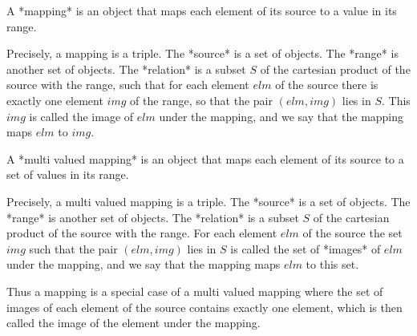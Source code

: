 
A *mapping* is an object that maps each element of its source to a value
in its range.

Precisely, a mapping is a triple.  The *source* is a set of objects.  The
*range* is another set of objects.  The *relation* is a subset $S$ of the
cartesian product  of  the  source  with  the range, such  that for  each
element $elm$ of  the source there is exactly  one element  $img$ of  the
range, so that the pair  $(elm,img)$ lies  in $S$.  This $img$ is  called
the image of  $elm$  under the mapping, and we say that the  mapping maps
$elm$ to $img$.

A  *multi valued mapping* is  an  object  that maps  each element  of its
source to a set of values in its range.

Precisely,  a multi valued mapping is a triple.  The *source* is a set of
objects.   The *range* is another set  of objects.  The *relation*  is  a
subset $S$ of the  cartesian product of  the  source with the range.  For
each  element  $elm$ of the  source  the  set  $img$  such  that the pair
$(elm,img)$ lies in $S$ is called the set of *images* of $elm$ under  the
mapping, and we say that the mapping maps $elm$ to this set.

Thus a mapping is a  special case of a multi valued mapping where the set
of  images of  each element of the source contains  exactly one  element,
which is then called the image of the element under the mapping.


